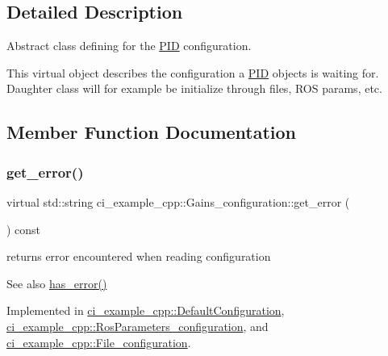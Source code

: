 \subsection{Detailed Description}
Abstract class defining for the \hyperlink{classci__example__cpp_1_1PID}{P\+ID} configuration. 

This virtual object describes the configuration a \hyperlink{classci__example__cpp_1_1PID}{P\+ID} objects is waiting for. Daughter class will for example be initialize through files, R\+OS params, etc. 

\subsection{Member Function Documentation}
\mbox{\label{classci__example__cpp_1_1Gains__configuration_a886100ef46082d1b9f8ee169318dc554}} 
\subsubsection{\texorpdfstring{get\+\_\+error()}{get\_error()}}
{\footnotesize\ttfamily virtual std\+::string ci\+\_\+example\+\_\+cpp\+::\+Gains\+\_\+configuration\+::get\+\_\+error (\begin{DoxyParamCaption}{ }\end{DoxyParamCaption}) const\hspace{0.3cm}{\ttfamily [pure virtual]}}



returns error encountered when reading configuration 

\begin{DoxySeeAlso}{See also}
\hyperlink{classci__example__cpp_1_1Gains__configuration_ae075925f60288519f8a4fcb477453a66}{has\+\_\+error()} 
\end{DoxySeeAlso}


Implemented in \hyperlink{classci__example__cpp_1_1DefaultConfiguration_a06034c96faa086c539a14643534d5aac}{ci\+\_\+example\+\_\+cpp\+::\+Default\+Configuration}, \hyperlink{classci__example__cpp_1_1RosParameters__configuration_aa6c44530007d18df221b22b84abcedea}{ci\+\_\+example\+\_\+cpp\+::\+Ros\+Parameters\+\_\+configuration}, and \hyperlink{classci__example__cpp_1_1File__configuration_aaf67f7d61d467563a4dce8aa69306a6a}{ci\+\_\+example\+\_\+cpp\+::\+File\+\_\+configuration}.

